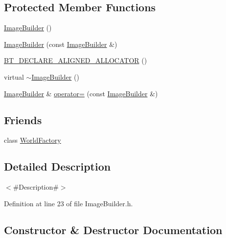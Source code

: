 \subsection*{Protected Member Functions}
\begin{DoxyCompactItemize}
\item 
\mbox{\hyperlink{classnjli_1_1_image_builder_af9547c56bce9f09b589ea57cecca23e1}{Image\+Builder}} ()
\item 
\mbox{\hyperlink{classnjli_1_1_image_builder_afe41d1344d28fbc203f4caa9b20f0085}{Image\+Builder}} (const \mbox{\hyperlink{classnjli_1_1_image_builder}{Image\+Builder}} \&)
\item 
\mbox{\hyperlink{classnjli_1_1_image_builder_a77188ee3604cdb3ac57bd3430a7e6dc0}{B\+T\+\_\+\+D\+E\+C\+L\+A\+R\+E\+\_\+\+A\+L\+I\+G\+N\+E\+D\+\_\+\+A\+L\+L\+O\+C\+A\+T\+OR}} ()
\item 
virtual \mbox{\hyperlink{classnjli_1_1_image_builder_a4d07c7768a7450c7fa5954a278cb92a9}{$\sim$\+Image\+Builder}} ()
\item 
\mbox{\hyperlink{classnjli_1_1_image_builder}{Image\+Builder}} \& \mbox{\hyperlink{classnjli_1_1_image_builder_a7ebb1a6acfb0a318300b6ea9de0caef0}{operator=}} (const \mbox{\hyperlink{classnjli_1_1_image_builder}{Image\+Builder}} \&)
\end{DoxyCompactItemize}
\subsection*{Friends}
\begin{DoxyCompactItemize}
\item 
class \mbox{\hyperlink{classnjli_1_1_image_builder_acb96ebb09abe8f2a37a915a842babfac}{World\+Factory}}
\end{DoxyCompactItemize}


\subsection{Detailed Description}
$<$\#\+Description\#$>$ 

Definition at line 23 of file Image\+Builder.\+h.



\subsection{Constructor \& Destructor Documentation}
\mbox{\label{classnjli_1_1_image_builder_af9547c56bce9f09b589ea57cecca23e1}} 
